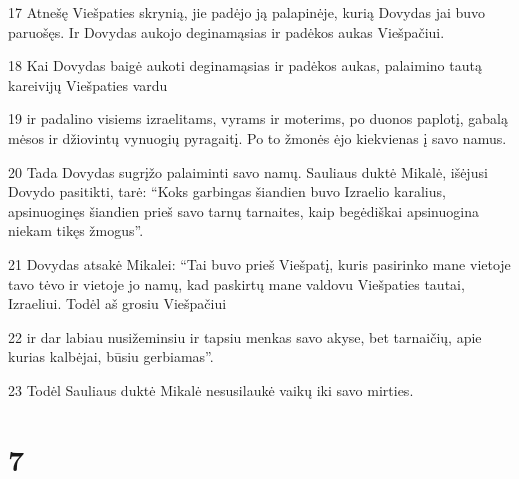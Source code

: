 \par 17 Atnešę Viešpaties skrynią, jie padėjo ją palapinėje, kurią Dovydas jai buvo paruošęs. Ir Dovydas aukojo deginamąsias ir padėkos aukas Viešpačiui. 
\par 18 Kai Dovydas baigė aukoti deginamąsias ir padėkos aukas, palaimino tautą kareivijų Viešpaties vardu 
\par 19 ir padalino visiems izraelitams, vyrams ir moterims, po duonos paplotį, gabalą mėsos ir džiovintų vynuogių pyragaitį. Po to žmonės ėjo kiekvienas į savo namus. 
\par 20 Tada Dovydas sugrįžo palaiminti savo namų. Sauliaus duktė Mikalė, išėjusi Dovydo pasitikti, tarė: “Koks garbingas šiandien buvo Izraelio karalius, apsinuoginęs šiandien prieš savo tarnų tarnaites, kaip begėdiškai apsinuogina niekam tikęs žmogus”. 
\par 21 Dovydas atsakė Mikalei: “Tai buvo prieš Viešpatį, kuris pasirinko mane vietoje tavo tėvo ir vietoje jo namų, kad paskirtų mane valdovu Viešpaties tautai, Izraeliui. Todėl aš grosiu Viešpačiui 
\par 22 ir dar labiau nusižeminsiu ir tapsiu menkas savo akyse, bet tarnaičių, apie kurias kalbėjai, būsiu gerbiamas”. 
\par 23 Todėl Sauliaus duktė Mikalė nesusilaukė vaikų iki savo mirties.



\chapter{7}

